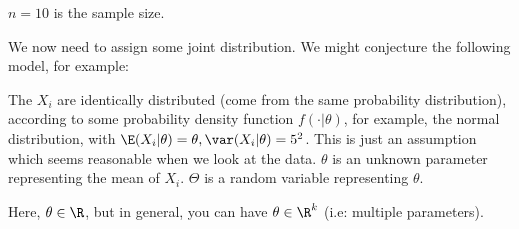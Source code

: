 \documentclass[a4paper]{article}
\begin{document}
                $n = 10$ is the sample size.

                We now need to assign some joint distribution. We might
                conjecture the following model, for example:

                The $X_i$ are identically distributed (come from the same
                probability distribution), according to some probability density
                function $f(\cdot | \theta)$, for example, the normal
                distribution, with $\E(X_i | \theta) = \theta, \var(X_i |
                \theta) = 5^2$. This is just an assumption which seems
                reasonable when we look at the data. $\theta$ is an unknown
                parameter representing the mean of $X_i$. $\Theta$ is a random
                variable representing $\theta$.

                Here, $\theta \in \R$, but in general, you can have $\theta \in
                \R^k$ (i.e: multiple parameters).
\end{document}
